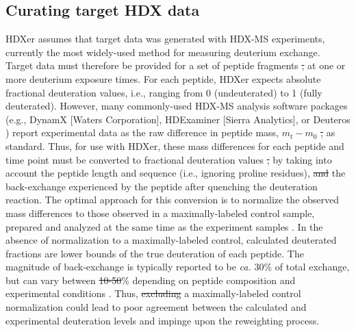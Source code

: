 \documentclass[9pt,tutorial]{livecoms}
\providecommand{\DIFadd}[1]{{\protect\color{blue}\uwave{#1}}} %
\providecommand{\DIFdel}[1]{{\protect\color{red}\sout{#1}}}                      %
\providecommand{\DIFaddbegin}{} %
\providecommand{\DIFaddend}{} %
\providecommand{\DIFdelbegin}{} %
\providecommand{\DIFdelend}{} %
\begin{document}
\subsection{Curating target HDX data}
HDXer assumes that target data was generated with HDX-MS experiments, \DIFaddbegin \DIFadd{which is }\DIFaddend currently the most widely-used method for measuring deuterium exchange.
Target data must therefore be provided for a set of peptide fragments \DIFdelbegin \DIFdel{, }\DIFdelend at one or more deuterium exposure times. 
For each peptide, HDXer expects absolute fractional deuteration values, i.e., ranging from 0 (undeuterated) to 1 (fully deuterated).
However, many commonly-used HDX-MS analysis software packages (e.g., DynamX [Waters Corporation], HDExaminer [Sierra Analytics], or Deuteros \cite{Lau2021}) report experimental data as the raw difference in peptide mass, $m_t - m_0$ \DIFdelbegin \DIFdel{, }\DIFdelend as standard.
Thus, for use with HDXer, these mass differences for each peptide and time point must be converted to fractional deuteration values \DIFdelbegin \DIFdel{, }\DIFdelend by taking into account the peptide length and sequence (i.e., ignoring proline residues), \DIFdelbegin \DIFdel{and }\DIFdelend \DIFaddbegin \DIFadd{as well as }\DIFaddend the back-exchange experienced by the peptide after quenching the deuteration reaction.
The optimal approach for this conversion is to normalize the observed mass differences to those observed in a maximally-labeled control sample, prepared and analyzed at the same time as the experiment samples \cite{Masson2019}.
In the absence of normalization to a maximally-labeled control, calculated deuterated fractions are lower bounds of the true deuteration of each peptide.
The magnitude of back-exchange is typically reported to be \textit{ca.} 30\% of total exchange, but can vary between \DIFdelbegin \DIFdel{10-50}\DIFdelend \DIFaddbegin \DIFadd{10 and 50}\DIFaddend \% depending on peptide composition and experimental conditions \cite{Walters2012}.
Thus, \DIFdelbegin \DIFdel{excluding }\DIFdelend \DIFaddbegin \DIFadd{omitting }\DIFaddend a maximally-labeled control normalization could lead to poor agreement between the calculated and experimental deuteration levels and impinge upon the reweighting process.
\end{document}
